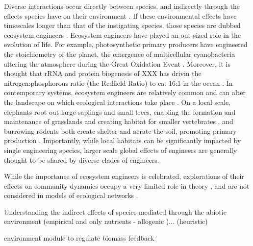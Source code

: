\documentclass[9pt,twocolumn,twoside]{pnas-new}
\begin{document}
Diverse interactions occur directly between species, and indirectly through the effects species have on their environment \cite{Jones1994,Olff2009,OdlingSmee2013}.
If these environmental effects have timescales longer than that of the instigating species, those species are dubbed ecosystem engineers \cite{Hastings2007}.
Ecosystem engineers have played an out-sized role in the evolution of life.
For example, photosynthetic primary producers have engineered the stoichiometry of the planet, the emergence of multicellular cyanobacteria altering the atmosphere during the Great Oxidation Event \cite{Schirrmeister2013}.
Moreover, it is thought that rRNA and protein biogenesis of XXX has drivin the nitrogen:phosphorous ratio (the Redfield Ratio) to ca. 16:1 in the ocean \cite{Loladze2011}.
In contemporary systems, ecosystem engineers are relatively common and can alter the landscape on which ecological interactions take place \cite{Wright2006}.
On a local scale, elephants root out large saplings and small trees, enabling the formation and maintenance of grasslands \cite{Haynes2012} and creating habitat for smaller vertebrates \cite{Pringle2008}, and burrowing rodents both create shelter and aerate the soil, promoting primary production \cite{Reichman2002}.
Importantly, while local habitats can be significantly impacted by single engineering species, larger scale global effects of engineers are generally thought to be shared by diverse clades of engineers.



While the importance of ecosystem engineers is celebrated, explorations of their effects on community dynamics occupy a very limited role in theory \cite{Hastings2007,OdlingSmee2013}, and are not considered in models of ecological networks \cite{Olff2009}.

Understanding the indirect effects of species mediated through the abiotic environment \cite{Olff2009} (empirical and only nutrients - allogenic \cite{Jones1994})... \cite{OdlingSmee2013} (heuristic)

\cite{Getz2011} environment module to regulate biomass feedback
\end{document}
